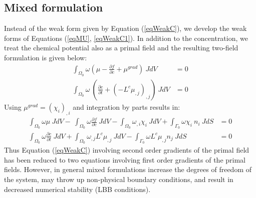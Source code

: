 \subsection{Mixed formulation}
Instead of the weak form given by Equation (\ref{eqWeakC}), we develop the weak forms of Equations  (\ref{eqMU}, \ref{eqWeakC1}). In addition to the concentration, we treat the chemical potential also as a primal field and the resulting two-field formulation is given below:
\begin{align}
\int_{\Omega_0}  \omega (\mu - \frac{\partial f}{\partial c}  + \mu^{grad}) ~J dV &=0 \\
\int_{\Omega_0}  \omega ~\left(  \frac{\partial  c }{\partial t} + \left(-L^c \mu_{,j} \right)_{,j} \right) ~J dV &= 0
\end{align}
Using $\mu^{grad} = (\chi_i)_{,i}$ and integration by parts results in:
\begin{align}
\int_{\Omega_0}  \omega \mu ~J dV - ~\int_{\Omega_0}  \omega \frac{\partial f}{\partial c} ~J dV  - \int_{\Omega_0}  \omega_{,i} \chi_i ~J dV +  \int_{\Gamma_0}  \omega \chi_i ~n_i ~J dS &=0 \\
\int_{\Omega_0}  \omega \frac{\partial c }{\partial t} ~J dV  + \int_{\Omega_0} \omega_{,j} L^{c} \mu_{,j} ~J dV - \int_{\Gamma_0}  \omega L^{c} \mu_{,j} n_j ~J dS &=0
\end{align}
Thus Equation (\ref{eqWeakC}) involving second order gradients of the primal field has been reduced to two equations involving first order gradients of the primal fields. However, in general mixed formulations increase the degrees of freedom of the system, may throw up non-physical boundary conditions, and result in decreased numerical stability (LBB conditions). 

